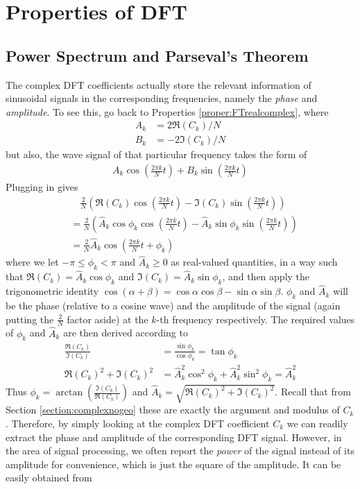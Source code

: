\section{Properties of DFT}

\subsection{Power Spectrum and Parseval’s Theorem}

The complex DFT coefficients actually store the relevant information of sinusoidal signals in the corresponding frequencies, namely the \textit{phase} and \textit{amplitude}. To see this, go back to Properties \ref{proper:FTrealcomplex}, where
\begin{align*}
A_k &= 2\Re(C_k)/N \\
B_k &= -2\Im(C_k)/N 
\end{align*}
but also, the wave signal of that particular frequency takes the form of
\begin{align*}
A_k \cos(\frac{2\pi k}{N}t) + B_k \sin(\frac{2\pi k}{N}t)
\end{align*}
Plugging in gives
\begin{align*}
&\quad \frac{2}{N} (\Re(C_k)\cos(\frac{2\pi k}{N}t) - \Im(C_k) \sin(\frac{2\pi k}{N}t)) \\
&= \frac{2}{N} (\hat{A}_k \cos \phi_k \cos(\frac{2\pi k}{N}t) - \hat{A}_k\sin\phi_k \sin(\frac{2\pi k}{N}t)) \\
&= \frac{2}{N} \hat{A}_k \cos(\frac{2\pi k}{N}t + \phi_k)
\end{align*}
where we let $-\pi \leq \phi_k < \pi$ and $\hat{A}_k \geq 0$ as real-valued quantities, in a way such that $\Re(C_k) = \hat{A}_k \cos \phi_k$ and $\Im(C_k) = \hat{A}_k \sin \phi_k$, and then apply the trigonometric identity $\cos(\alpha + \beta) = \cos\alpha \cos\beta - \sin\alpha \sin\beta$. $\phi_k$ and $\hat{A}_k$ will be the phase (relative to a cosine wave) and the amplitude of the signal (again putting the $\frac{2}{N}$ factor aside) at the $k$-th frequency respectively. The required values of $\phi_k$ and $\hat{A}_k$ are then derived according to
\begin{align*}
\frac{\Re(C_k)}{\Im(C_k)} &= \frac{\sin \phi_k}{\cos \phi_k} = \tan \phi_k \\
\Re(C_k)^2 + \Im(C_k)^2 &= \hat{A}_k^2 \cos^2 \phi_k + \hat{A}_k^2 \sin^2 \phi_k = \hat{A}_k^2 
\end{align*}
Thus $\phi_k = \arctan(\frac{\Im(C_k)}{\Re(C_k)})$ and $\hat{A}_k = \sqrt{\Re(C_k)^2 + \Im(C_k)^2}$. Recall that from Section \ref{section:complexnogeo} these are exactly the argument and modulus of $C_k$. Therefore, by simply looking at the complex DFT coefficient $C_k$ we can readily extract the phase and amplitude of the corresponding DFT signal. However, in the area of signal processing, we often report the \textit{power} of the signal instead of its amplitude for convenience, which is just the square of the amplitude. It can be easily obtained from
